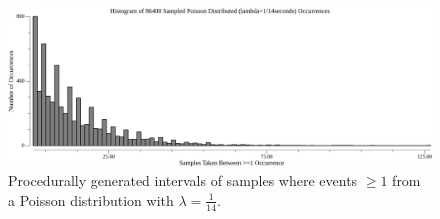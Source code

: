 \documentclass[11pt]{article}
\begin{document}
	\begin{figure}[tph!]
		\label{vis_poisson_samples_eventintervals_hist}
		\centering
		\includegraphics[width=1.0\textwidth]{go-block-step/out/vis_poisson_samples_eventintervals_hist.png}
		\caption{
			Procedurally generated intervals of samples where events $\geq 1$ from
			a Poisson distribution with $\lambda = \frac{1}{14}$.
		}
	\end{figure}


%
\end{document}
